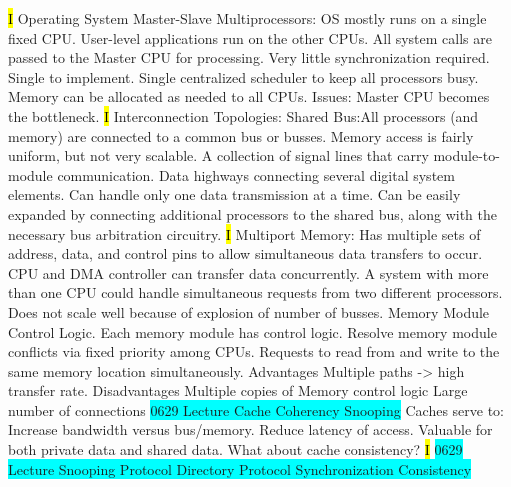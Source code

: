 \documentclass[fontsize=4pt]{scrartcl}
\begin{document}
\hl{I}
Operating System Master-Slave Multiprocessors: OS mostly runs on a single fixed CPU. User-level applications run on the other CPUs. All system calls are passed to the Master CPU for processing. Very little synchronization required. Single to implement. Single centralized scheduler to keep all processors busy. Memory can be allocated as needed to all CPUs. Issues: Master CPU becomes the bottleneck.
\hl{I} 
Interconnection Topologies: Shared Bus:All processors (and memory) are connected to a  common bus or busses. Memory access is fairly uniform, but not very scalable. A collection of signal lines that carry module-to-module communication. Data highways connecting several digital system elements. Can handle only one data transmission at a time. Can be easily expanded by connecting additional processors to the shared bus, along with the necessary bus arbitration circuitry.
\hl{I}
Multiport Memory: Has multiple sets of address, data, and control pins to allow simultaneous data transfers to occur. CPU and DMA controller can transfer data concurrently. A system with more than one CPU could handle simultaneous requests from two different processors. Does not scale well because of explosion of number of busses. Memory Module Control Logic. Each memory module has control logic. Resolve memory module conflicts via fixed priority among CPUs. Requests to read from and write to the same memory location simultaneously. Advantages Multiple paths -> high transfer rate. Disadvantages Multiple copies of Memory control logic Large number of connections
\colorbox{Cyan}{0629 Lecture Cache Coherency Snooping} Caches serve to: Increase bandwidth versus bus/memory. Reduce latency of access. Valuable for both private data and shared data. What about cache consistency?
\hl{I}
\colorbox{Cyan}{0629 Lecture Snooping Protocol Directory Protocol Synchronization Consistency}
\end{document}
